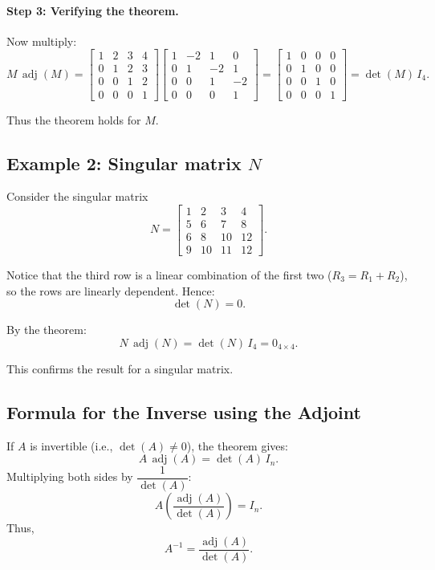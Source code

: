 \documentclass{article}
\begin{document}
\paragraph{Step 3: Verifying the theorem.}
Now multiply:
\[
M\,\operatorname{adj}(M)=
\begin{bmatrix}
1 & 2 & 3 & 4 \\
0 & 1 & 2 & 3 \\
0 & 0 & 1 & 2 \\
0 & 0 & 0 & 1
\end{bmatrix}
\begin{bmatrix}
1 & -2 & 1 & 0\\
0 & 1 & -2 & 1\\
0 & 0 & 1 & -2\\
0 & 0 & 0 & 1
\end{bmatrix}
=
\begin{bmatrix}
1 & 0 & 0 & 0 \\
0 & 1 & 0 & 0 \\
0 & 0 & 1 & 0 \\
0 & 0 & 0 & 1
\end{bmatrix}
= \det(M)\,I_4.
\]

Thus the theorem holds for $M$.

\bigskip
\subsection*{Example 2: Singular matrix $N$}

Consider the singular matrix
\[
N =
\begin{bmatrix}
1 & 2 & 3 & 4 \\
5 & 6 & 7 & 8 \\
6 & 8 & 10 & 12 \\
9 & 10 & 11 & 12
\end{bmatrix}.
\]

Notice that the third row is a linear combination of the first two ($R_3 = R_1 + R_2$), so the rows are linearly dependent. Hence:
\[
\det(N) = 0.
\]

By the theorem:
\[
N\,\operatorname{adj}(N) = \det(N)\,I_4 = 0_{4\times4}.
\]

This confirms the result for a singular matrix.

\bigskip
\subsection*{Formula for the Inverse using the Adjoint}

If $A$ is invertible (i.e., $\det(A)\neq 0$), the theorem gives:
\[
A\,\operatorname{adj}(A) = \det(A)\,I_n.
\]
Multiplying both sides by $\dfrac{1}{\det(A)}$:
\[
A \left( \frac{\operatorname{adj}(A)}{\det(A)} \right) = I_n.
\]
Thus,
\[
\boxed{A^{-1} = \frac{\operatorname{adj}(A)}{\det(A)}.}
\]
\end{document}
